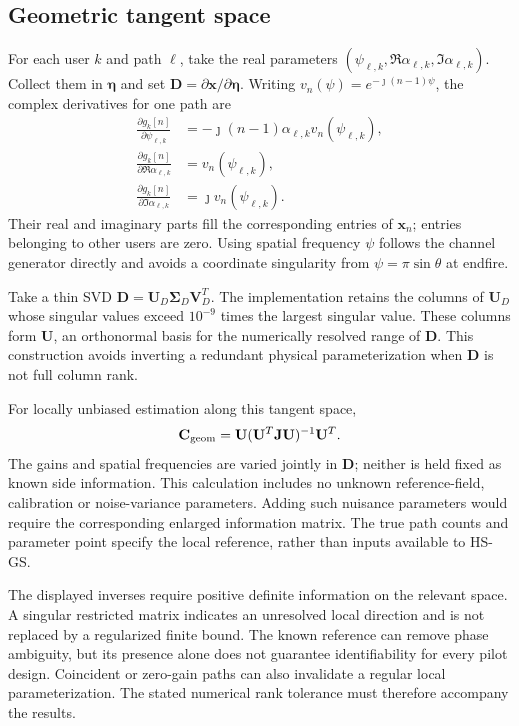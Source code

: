 \documentclass[journal]{IEEEtran}
\begin{document}
\subsection{Geometric tangent space}

For each user $k$ and path $\ell$, take the real parameters
$(\psi_{\ell,k},\Re\alpha_{\ell,k},\Im\alpha_{\ell,k})$.
Collect them in $\boldsymbol\eta$ and set
$\mathbf D=\partial\mathbf x/\partial\boldsymbol\eta$.
Writing $v_n(\psi)=e^{-\jmath(n-1)\psi}$, the complex derivatives for
one path are
\begin{align}
\frac{\partial g_k[n]}{\partial\psi_{\ell,k}}
 &=-\jmath(n-1)\alpha_{\ell,k}v_n(\psi_{\ell,k}),\\
\frac{\partial g_k[n]}{\partial\Re\alpha_{\ell,k}}
 &=v_n(\psi_{\ell,k}),\\
\frac{\partial g_k[n]}{\partial\Im\alpha_{\ell,k}}
 &=\jmath v_n(\psi_{\ell,k}).
\end{align}
Their real and imaginary parts fill the corresponding entries of
$\mathbf x_n$; entries belonging to other users are zero. Using spatial
frequency $\psi$ follows the channel generator directly and avoids a
coordinate singularity from $\psi=\pi\sin\theta$ at endfire.

Take a thin SVD $\mathbf D=\mathbf U_D\boldsymbol\Sigma_D\mathbf V_D^T$.
The implementation retains the columns of $\mathbf U_D$ whose singular
values exceed $10^{-9}$ times the largest singular value. These columns
form $\mathbf U$, an orthonormal basis for the numerically resolved range
of $\mathbf D$. This construction avoids inverting a redundant physical
parameterization when $\mathbf D$ is not full column rank.

For locally unbiased estimation along this tangent space,
\begin{equation}
\mathbf C_{\rm geom}
=\mathbf U(\mathbf U^T\mathbf J\mathbf U)^{-1}\mathbf U^T.
\end{equation}
The gains and spatial frequencies are varied jointly in $\mathbf D$;
neither is held fixed as known side information. This calculation includes
no unknown reference-field, calibration or noise-variance parameters.
Adding such nuisance parameters would require the corresponding enlarged
information matrix. The true path counts and parameter point specify the
local reference, rather than inputs available to HS-GS.

The displayed inverses require positive definite information on the
relevant space. A singular restricted matrix indicates an unresolved
local direction and is not replaced by a regularized finite bound.
The known reference can remove phase ambiguity, but its presence alone
does not guarantee identifiability for every pilot design. Coincident or
zero-gain paths can also invalidate a regular local parameterization.
The stated numerical rank tolerance must therefore accompany the results.
\end{document}

